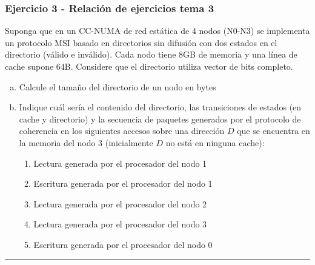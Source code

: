 \documentclass[10pt,a4paper,spanish]{report}
\begin{document}
\textcolor[rgb]{0.2,0.4,0.8}{\subsubsection{Ejercicio 3 - Relación de ejercicios tema 3}}
\label{ej_no_dif}
Suponga que en un CC-NUMA de red estática de 4 nodos (N0-N3) se implementa un protocolo MSI basado en directorios sin difusión con dos estados en el directorio (válido e inválido). Cada nodo tiene 8GB de memoria y una línea de cache supone 64B. Considere que el directorio utiliza vector de bits completo.
\begin{enumerate}[a)]
    \item Calcule el tamaño del directorio de un nodo en bytes
    \item Indique cuál sería el contenido del directorio, las transiciones de estados (en cache y directorio) y la secuencia de paquetes generados por el protocolo de coherencia en los siguientes accesos sobre una dirección $D$ que se encuentra en la memoria del nodo 3 (inicialmente $D$ no está en ninguna cache):
    \begin{enumerate}[1.]
        \item Lectura generada por el procesador del nodo 1
        \item Escritura generada por el procesador del nodo 1
        \item Lectura generada por el procesador del nodo 2
        \item Lectura generada por el procesador del nodo 3
        \item Escritura generada por el procesador del nodo 0
    \end{enumerate}
\end{enumerate}

\rule{\linewidth}{0.05mm}
\end{document}
